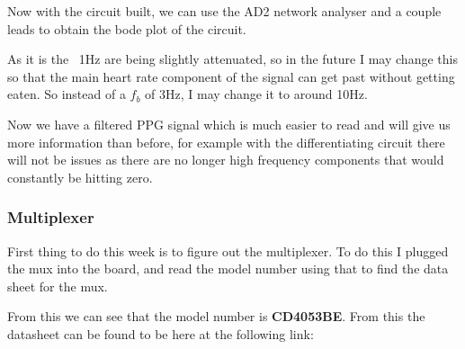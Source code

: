 \documentclass{article}
\begin{document}
Now with the circuit built, we can use the AD2 network analyser and a couple leads to obtain the bode plot of the circuit.
\begin{center}
\end{center}
As it is the ~1Hz are being slightly attenuated, so in the future I may change this so that the main heart rate component of the signal can get past without getting eaten. So instead of a $f_b$ of 3Hz, I may change it to around 10Hz.
\begin{center}
\end{center}
Now we have a filtered PPG signal which is much easier to read and will give us more information than before, for example with the differentiating circuit there will not be issues as there are no longer high frequency components that would constantly be hitting zero.
\newpage
\subsubsection{Multiplexer}
First thing to do this week is to figure out the multiplexer. To do this I plugged the mux into the board, and read the model number using that to find the data sheet for the mux.
\begin{center}
\end{center}
From this we can see that the model number is \textbf{CD4053BE}. From this the datasheet can be found to be here at the following link:
\end{document}
